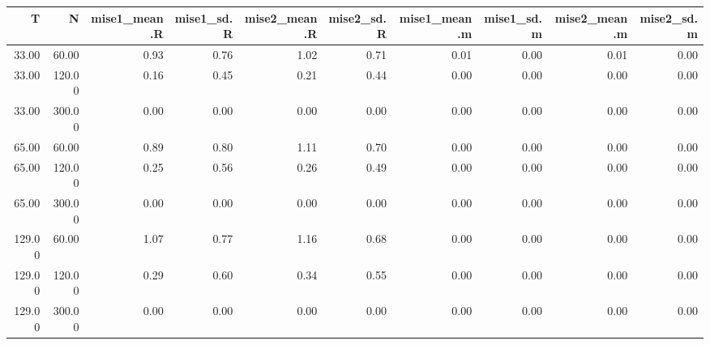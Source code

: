 \begin{table}[ht]
\centering
\begin{tabular}{rrrrrrrrrr}
  \hline
T & N & mise1\_mean.R & mise1\_sd.R & mise2\_mean.R & mise2\_sd.R & mise1\_mean.m & mise1\_sd.m & mise2\_mean.m & mise2\_sd.m \\ 
  \hline
33.00 & 60.00 & 0.93 & 0.76 & 1.02 & 0.71 & 0.01 & 0.00 & 0.01 & 0.00 \\ 
  33.00 & 120.00 & 0.16 & 0.45 & 0.21 & 0.44 & 0.00 & 0.00 & 0.00 & 0.00 \\ 
  33.00 & 300.00 & 0.00 & 0.00 & 0.00 & 0.00 & 0.00 & 0.00 & 0.00 & 0.00 \\ 
  65.00 & 60.00 & 0.89 & 0.80 & 1.11 & 0.70 & 0.00 & 0.00 & 0.00 & 0.00 \\ 
  65.00 & 120.00 & 0.25 & 0.56 & 0.26 & 0.49 & 0.00 & 0.00 & 0.00 & 0.00 \\ 
  65.00 & 300.00 & 0.00 & 0.00 & 0.00 & 0.00 & 0.00 & 0.00 & 0.00 & 0.00 \\ 
  129.00 & 60.00 & 1.07 & 0.77 & 1.16 & 0.68 & 0.00 & 0.00 & 0.00 & 0.00 \\ 
  129.00 & 120.00 & 0.29 & 0.60 & 0.34 & 0.55 & 0.00 & 0.00 & 0.00 & 0.00 \\ 
  129.00 & 300.00 & 0.00 & 0.00 & 0.00 & 0.00 & 0.00 & 0.00 & 0.00 & 0.00 \\ 
   \hline
\end{tabular}
\end{table}
